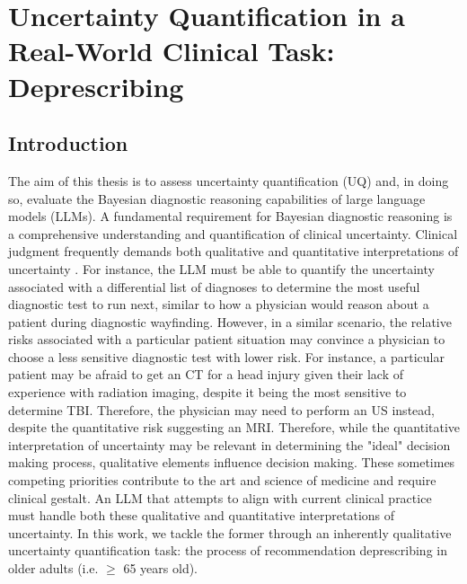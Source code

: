\chapter{Uncertainty Quantification in a Real-World Clinical Task: Deprescribing} \label{chapter:deprescribing}

\section{Introduction}
The aim of this thesis is to assess uncertainty quantification (UQ) and, in doing so, evaluate the Bayesian diagnostic reasoning capabilities of large language models (LLMs). A fundamental requirement for Bayesian diagnostic reasoning is a comprehensive understanding and quantification of clinical uncertainty. Clinical judgment frequently demands both qualitative and quantitative interpretations of uncertainty \cite{one of the papers from David list recently}. For instance, the LLM must be able to quantify the uncertainty associated with a differential list of diagnoses to determine the most useful diagnostic test to run next, similar to how a physician would reason about a patient during diagnostic wayfinding. However, in a similar scenario, the relative risks associated with a particular patient situation may convince a physician to choose a less sensitive diagnostic test with lower risk. For instance, a particular patient may be afraid to get an CT for a head injury given their lack of experience with radiation imaging, despite it being the most sensitive to determine TBI. Therefore, the physician may need to perform an US instead, despite the quantitative risk suggesting an MRI. Therefore, while the quantitative interpretation of uncertainty may be relevant in determining the "ideal" decision making process, qualitative elements influence decision making. These sometimes competing priorities contribute to the art and science of medicine and require clinical gestalt. An LLM that attempts to align with current clinical practice must handle both these qualitative and quantitative interpretations of uncertainty. In this work, we tackle the former through an inherently qualitative uncertainty quantification task: the process of recommendation deprescribing in older adults (i.e. $\geq$ 65 years old). 

